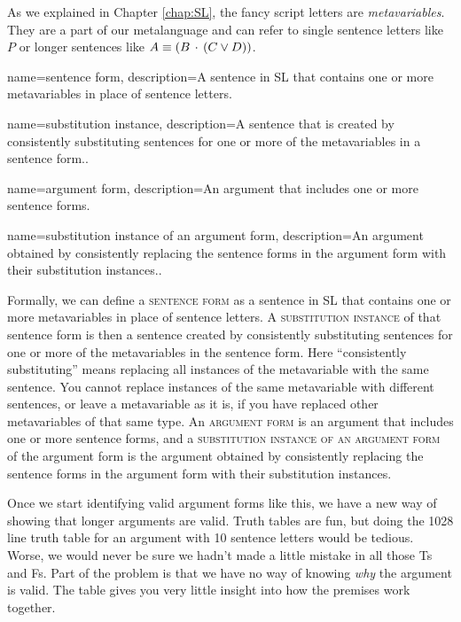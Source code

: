 As we explained in Chapter \ref{chap:SL}, the fancy script letters are \emph{metavariables}.  They are a part of our metalanguage and can refer to single sentence letters like $P$ or longer sentences like $A \equiv (B \,\cdot\, (C \vee D))$. 

{
name=sentence form,
description={A sentence in SL that contains one or more metavariables in place of sentence letters.}
}



{
name=substitution instance,
description={A sentence that is created by consistently substituting sentences for one or more of the metavariables in a sentence form..}
}


{
name=argument form,
description={An argument that includes one or more sentence forms.}
}


{
name=substitution instance of an argument form,
description={An argument obtained by consistently replacing the sentence forms in the argument form with their substitution instances..}
}



Formally, we can define a \textsc{\gls{sentence form}}\label{def:sentence_form} as a sentence in SL that contains one or more metavariables in place of sentence letters. A \textsc{\gls{substitution instance}}\label{def:substitution_instance} of that sentence form is then a sentence created by consistently substituting sentences for one or more of the metavariables in the sentence form. Here ``consistently substituting'' means replacing all instances of the metavariable with the same sentence. You cannot replace instances of the same metavariable with different sentences, or leave a metavariable as it is, if you have replaced other metavariables of that same type. An \textsc{\gls{argument form}}\label{def:argument_form}
 is an argument that includes one or more sentence forms, and a \textsc{\gls{substitution instance of an argument form}}\label{def:substitution instance_of_an_argument_form} of the argument form is the argument obtained by consistently replacing the sentence forms in the argument form with their substitution instances.

Once we start identifying valid argument forms like this, we have a new way of showing that longer arguments are valid. Truth tables are fun, but doing the 1028 line truth table for an argument with 10 sentence letters would be tedious. Worse, we would never be sure we hadn't made a little mistake in all those Ts and Fs. Part of the problem is that we have no way of knowing  \emph{why} the argument is valid. The table gives you very little insight into how the premises work together. 

